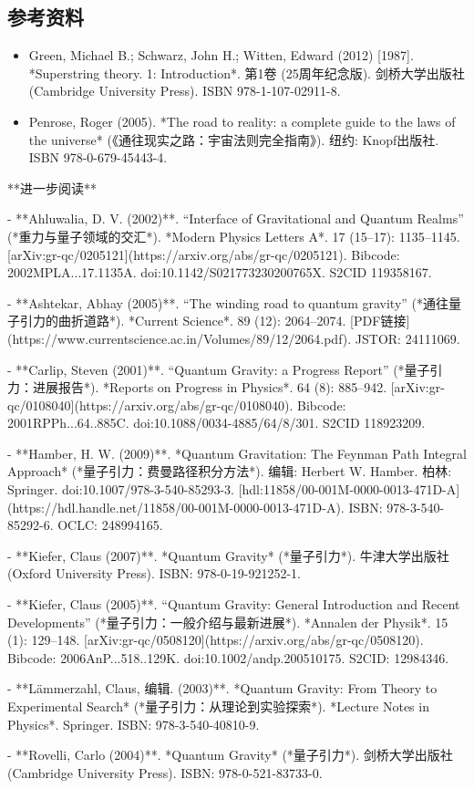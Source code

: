 \subsection{参考资料}
\begin{itemize}
\item Green, Michael B.; Schwarz, John H.; Witten, Edward (2012) [1987]. *Superstring theory. 1: Introduction*. 第1卷 (25周年纪念版). 剑桥大学出版社 (Cambridge University Press). ISBN 978-1-107-02911-8.
\item Penrose, Roger (2005). *The road to reality: a complete guide to the laws of the universe* (《通往现实之路：宇宙法则完全指南》). 纽约: Knopf出版社. ISBN 978-0-679-45443-4.
\end{itemize}
**进一步阅读**

- **Ahluwalia, D. V. (2002)**. “Interface of Gravitational and Quantum Realms” (*重力与量子领域的交汇*). *Modern Physics Letters A*. 17 (15–17): 1135–1145. [arXiv:gr-qc/0205121](https://arxiv.org/abs/gr-qc/0205121). Bibcode: 2002MPLA...17.1135A. doi:10.1142/S021773230200765X. S2CID 119358167.

- **Ashtekar, Abhay (2005)**. “The winding road to quantum gravity” (*通往量子引力的曲折道路*). *Current Science*. 89 (12): 2064–2074. [PDF链接](https://www.currentscience.ac.in/Volumes/89/12/2064.pdf). JSTOR: 24111069.

- **Carlip, Steven (2001)**. “Quantum Gravity: a Progress Report” (*量子引力：进展报告*). *Reports on Progress in Physics*. 64 (8): 885–942. [arXiv:gr-qc/0108040](https://arxiv.org/abs/gr-qc/0108040). Bibcode: 2001RPPh...64..885C. doi:10.1088/0034-4885/64/8/301. S2CID 118923209.

- **Hamber, H. W. (2009)**. *Quantum Gravitation: The Feynman Path Integral Approach* (*量子引力：费曼路径积分方法*). 编辑: Herbert W. Hamber. 柏林: Springer. doi:10.1007/978-3-540-85293-3. [hdl:11858/00-001M-0000-0013-471D-A](https://hdl.handle.net/11858/00-001M-0000-0013-471D-A). ISBN: 978-3-540-85292-6. OCLC: 248994165.

- **Kiefer, Claus (2007)**. *Quantum Gravity* (*量子引力*). 牛津大学出版社 (Oxford University Press). ISBN: 978-0-19-921252-1.

- **Kiefer, Claus (2005)**. “Quantum Gravity: General Introduction and Recent Developments” (*量子引力：一般介绍与最新进展*). *Annalen der Physik*. 15 (1): 129–148. [arXiv:gr-qc/0508120](https://arxiv.org/abs/gr-qc/0508120). Bibcode: 2006AnP...518..129K. doi:10.1002/andp.200510175. S2CID: 12984346.

- **Lämmerzahl, Claus, 编辑. (2003)**. *Quantum Gravity: From Theory to Experimental Search* (*量子引力：从理论到实验探索*). *Lecture Notes in Physics*. Springer. ISBN: 978-3-540-40810-9.

- **Rovelli, Carlo (2004)**. *Quantum Gravity* (*量子引力*). 剑桥大学出版社 (Cambridge University Press). ISBN: 978-0-521-83733-0.